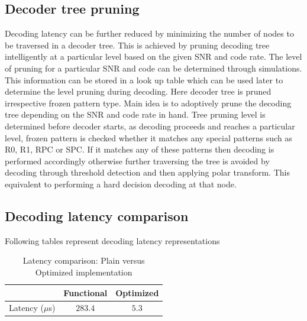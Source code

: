 \subsection{Decoder tree pruning}
Decoding latency can be further reduced by minimizing the number of nodes to be traversed in a decoder tree. This is achieved by pruning decoding tree intelligently at a particular level based on the given SNR and code rate. The level of pruning for a particular SNR and code can be determined through simulations. This information can be stored in a look up table which can be used later to determine the level pruning during decoding. Here decoder tree is pruned irrespective frozen pattern type. Main idea is to adoptively prune the decoding tree depending on the SNR and code rate in hand. Tree pruning level is determined before decoder starts, as decoding proceeds and reaches a particular level, frozen pattern is checked whether it matches any special patterns such as R0, R1, RPC or SPC. If it matches any of these patterns then decoding is performed accordingly otherwise further traversing the tree is avoided by decoding through threshold detection and then applying polar transform. This equivalent to performing a hard decision decoding at that node.




\subsection{Decoding latency comparison}
Following tables represent decoding latency representations
\begin{table}[!h]
	\begin{center}
		\caption{Latency comparison: Plain versus Optimized implementation}
		\label{tab:decoderLatency}
		\begin{tabular}{c|c|c} %
			\textbf{ } & Functional & Optimized \\
			\hline
			Latency ($\mu$s) & $283.4$ & $5.3$\\
		\end{tabular}
	\end{center}
\end{table}

